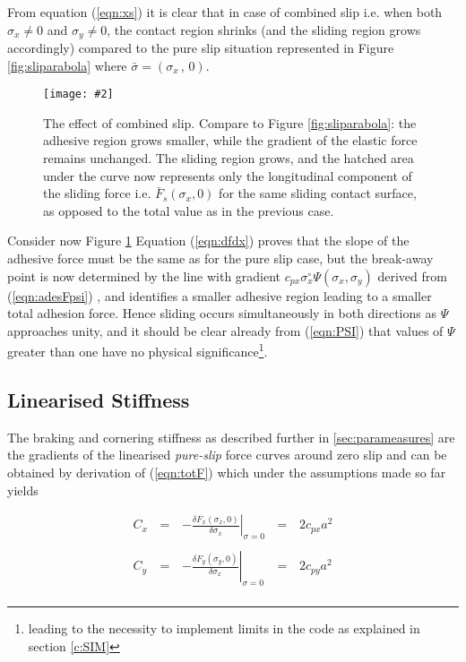 \documentclass[12pt,a4paper]{report}
\newcommand{\figura}[5][htbp]{
\begin{figure}[#1]
\begin{center}
\texttt{[image: \#2]}
\caption{#4}\label{#5}
\end{center}
\end{figure}
}
\newcommand{\eq}[2]{
\begin{equation} \label{#1}
#2
\end{equation}
}
\newcommand{\req}[1]{
(\ref{#1})
}
\begin{document}
From equation \req{eqn:xs} it is clear that in case of combined slip i.e. when both $\sigma_x \neq 0$ and $\sigma_y \neq 0$, the contact region shrinks (and the sliding region grows accordingly) compared to the pure slip situation represented in Figure \ref{fig:sliparabola} where $\bar{\sigma}=(\sigma_x \, , \, 0)$.

\figura{pix/sliparabola2.jpg}{width=12cm}{The effect of combined slip. Compare to Figure \ref{fig:sliparabola}: the adhesive region grows smaller, while the gradient of the elastic force remains unchanged. The sliding region grows, and the hatched area under the curve now represents only the longitudinal component of the sliding force i.e. $\bar{F}_{s}(\sigma_x,0)$ for the same sliding contact surface, as opposed to the total value as in the previous case.}{fig:sliparabola2}

Consider now Figure \ref{fig:sliparabola2}
Equation \req{eqn:dfdx} proves that the slope of the adhesive force must be the same as for the pure slip case, but the break-away point is now determined by the line with gradient $c_{px} \sigma ^{\circ}_x \Psi(\sigma_x, \sigma_y)$ derived from \req{eqn:adesFpsi}, and identifies a smaller adhesive region leading to a smaller total adhesion force.
Hence sliding occurs simultaneously in both directions as $\Psi$ approaches unity, and it should be clear already from \req{eqn:PSI} that values of $\Psi$ greater than one have no physical significance\footnote{leading to the necessity to implement limits in the code as explained in section \ref{c:SIM}}.

\subsection*{Linearised Stiffness}
The braking and cornering stiffness as described further in \ref{sec:parameasures} are the gradients of the linearised \emph{pure-slip} force curves around zero slip and can be obtained by derivation of \req{eqn:totF} which under the assumptions made so far yields
\eq{eqn:tireStif}{
\begin{array}{rcccl}
 C_x   &\, = \, &\displaystyle   \left. -\frac{\delta F_{x}(\sigma_x,0)}{\delta \sigma_x} \right|_{\sigma=0}  &\, = \, & 2c_{px}a^2\\
 \\
 C_y   &\, = \, &\displaystyle   \left. -\frac{\delta F_{y}(\sigma_y,0)}{\delta \sigma_x} \right|_{\sigma=0}  &\, = \, & 2c_{py}a^2\\
\end{array}
}
\end{document}
